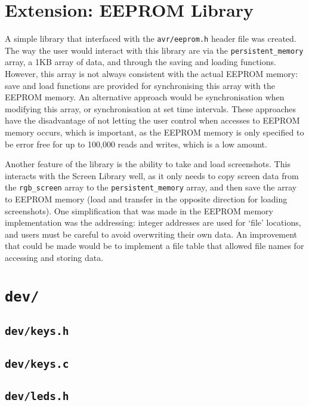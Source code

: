 \documentclass[a4paper,10pt]{article}
\begin{document}
\section*{Extension: EEPROM Library}
A simple library that interfaced with the \texttt{avr/eeprom.h} header file
was created. The way the user would interact with this library are via the
\texttt{persistent\_memory} array, a 1KB array of data, and through the saving
and loading functions. However, this array is not always consistent with the
actual EEPROM memory: save and load functions are provided for synchronising
this array with the EEPROM memory. An alternative approach would be
synchronisation when modifying this array, or synchronisation at set time
intervals. These approaches have the disadvantage of not letting the user
control when accesses to EEPROM memory occurs, which is important, as the
EEPROM memory is only specified to be error free for up to 100,000 reads and
writes, which is a low amount.

Another feature of the library is the ability to take and load screenshots.
This interacts with the Screen Library well, as it only needs to copy screen
data from the \texttt{rgb\_screen} array to the \texttt{persistent\_memory}
array, and then save the array to EEPROM memory (load and transfer in the
opposite direction for loading screenshots).
One simplification that was made in the EEPROM memory implementation was the
addressing: integer addresses are used for `file' locations, and users must
be careful to avoid overwriting their own data. An improvement that could be
made would be to implement a file table that allowed file names for accessing
and storing data.

\appendix

\section{\texttt{dev/}}

\subsection{\texttt{dev/keys.h}}


\subsection{\texttt{dev/keys.c}}


\subsection{\texttt{dev/leds.h}}

\end{document}
